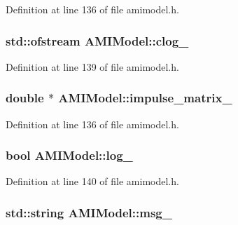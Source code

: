 Definition at line 136 of file amimodel.\+h.

\hypertarget{class_a_m_i_model_a9b1c44767e4e81c4dfcff9bc23907b6c}{}
\subsubsection[{clog\+\_\+}]{\setlength{\rightskip}{0pt plus 5cm}std\+::ofstream A\+M\+I\+Model\+::clog\+\_\+\hspace{0.3cm}{\ttfamily [protected]}}\label{class_a_m_i_model_a9b1c44767e4e81c4dfcff9bc23907b6c}


Definition at line 139 of file amimodel.\+h.

\hypertarget{class_a_m_i_model_a26c35bff12c048655bdbd8663a2f0f58}{}
\subsubsection[{impulse\+\_\+matrix\+\_\+}]{\setlength{\rightskip}{0pt plus 5cm}double $\ast$ A\+M\+I\+Model\+::impulse\+\_\+matrix\+\_\+\hspace{0.3cm}{\ttfamily [protected]}}\label{class_a_m_i_model_a26c35bff12c048655bdbd8663a2f0f58}


Definition at line 136 of file amimodel.\+h.

\hypertarget{class_a_m_i_model_ae701c08f6c4b0d962df4a2f2dcb6196b}{}
\subsubsection[{log\+\_\+}]{\setlength{\rightskip}{0pt plus 5cm}bool A\+M\+I\+Model\+::log\+\_\+\hspace{0.3cm}{\ttfamily [protected]}}\label{class_a_m_i_model_ae701c08f6c4b0d962df4a2f2dcb6196b}


Definition at line 140 of file amimodel.\+h.

\hypertarget{class_a_m_i_model_acc9d4703088b0a69f649c84a1e134cfd}{}
\subsubsection[{msg\+\_\+}]{\setlength{\rightskip}{0pt plus 5cm}std\+::string A\+M\+I\+Model\+::msg\+\_\+\hspace{0.3cm}{\ttfamily [protected]}}\label{class_a_m_i_model_acc9d4703088b0a69f649c84a1e134cfd}


